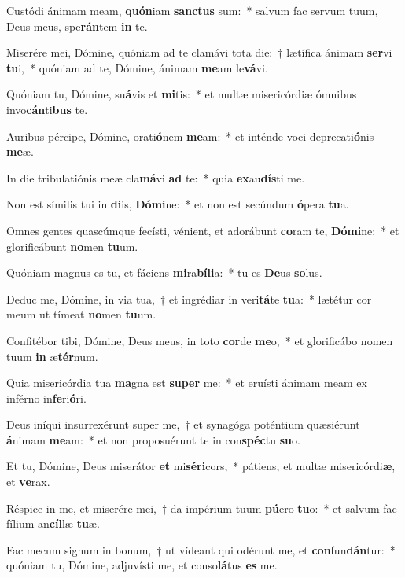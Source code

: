 \item Custódi ánimam meam, \textbf{quón}iam \textbf{sanc}\textbf{tus} sum:~* salvum fac servum tuum, Deus meus, spe\textbf{rán}tem \textbf{in} te.
\item Miserére mei, Dómine, quóniam ad te clamávi tota die:~† lætífica ánimam \textbf{ser}vi \textbf{tu}i,~* quóniam ad te, Dómine, ánimam \textbf{me}am le\textbf{vá}vi.
\item Quóniam tu, Dómine, su\textbf{á}vis et \textbf{mi}tis:~* et multæ misericórdiæ ómnibus invo\textbf{cán}ti\textbf{bus} te.
\item Auribus pércipe, Dómine, orati\textbf{ó}nem \textbf{me}am:~* et inténde voci deprecati\textbf{ó}nis \textbf{me}æ.
\item In die tribulatiónis meæ cla\textbf{má}vi \textbf{ad} te:~* quia \textbf{ex}au\textbf{dís}ti me.
\item Non est símilis tui in \textbf{di}is, \textbf{Dó}\textbf{mi}ne:~* et non est secúndum \textbf{ó}pera \textbf{tu}a.
\item Omnes gentes quascúmque fecísti, vénient, et adorábunt \textbf{co}ram te, \textbf{Dó}\textbf{mi}ne:~* et glorificábunt \textbf{no}men \textbf{tu}um.
\item Quóniam magnus es tu, et fáciens \textbf{mi}ra\textbf{bí}\textbf{li}a:~* tu es \textbf{De}us \textbf{so}lus.
\item Deduc me, Dómine, in via tua,~† et ingrédiar in veri\textbf{tá}te \textbf{tu}a:~* lætétur cor meum ut tímeat \textbf{no}men \textbf{tu}um.
\item Confitébor tibi, Dómine, Deus meus, in toto \textbf{cor}de \textbf{me}o,~* et glorificábo nomen tuum \textbf{in} æ\textbf{tér}num.
\item Quia misericórdia tua \textbf{ma}gna est \textbf{su}\textbf{per} me:~* et eruísti ánimam meam ex inférno in\textbf{fe}ri\textbf{ó}ri.
\item Deus iníqui insurrexérunt super me,~† et synagóga poténtium quæsiérunt \textbf{á}nimam \textbf{me}am:~* et non proposuérunt te in con\textbf{spéc}tu \textbf{su}o.
\item Et tu, Dómine, Deus miserátor \textbf{et} mi\textbf{sé}\textbf{ri}cors,~* pátiens, et multæ misericórdi\textbf{æ}, et \textbf{ve}rax.
\item Réspice in me, et miserére mei,~† da impérium tuum \textbf{pú}ero \textbf{tu}o:~* et salvum fac fílium an\textbf{cíl}læ \textbf{tu}æ.
\item Fac mecum signum in bonum,~† ut vídeant qui odérunt me, et \textbf{con}fun\textbf{dán}tur:~* quóniam tu, Dómine, adjuvísti me, et conso\textbf{lá}tus \textbf{es} me.
